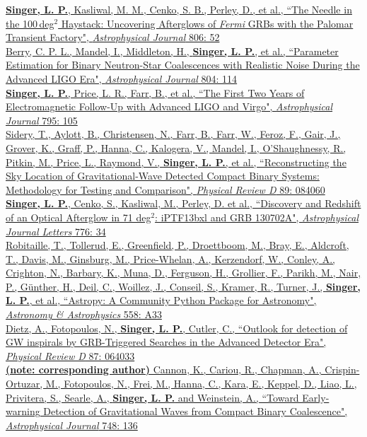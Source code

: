 \documentclass[10pt, letterpaper]{article} %
\newcommand{\years}[1]{\marginnote{\scriptsize #1}} %
\begin{document}
\years{2015}\href{http://dx.doi.org/10.1088/0004-637X/806/1/52}{\textbf{Singer, L. P.}, Kasliwal, M. M., Cenko, S. B., Perley, D., et al., “The Needle in the 100\,deg$^2$ Haystack: Uncovering Afterglows of \emph{Fermi} GRBs with the Palomar Transient Factory", \emph{Astrophysical Journal} 806: 52}\\[0.125cm]
%
\years{2015}\href{http://dx.doi.org/10.1088/0004-637X/804/2/114}{Berry, C. P. L., Mandel, I., Middleton, H., \textbf{Singer, L. P.}, et al., “Parameter Estimation for Binary Neutron-Star Coalescences with Realistic Noise During the Advanced LIGO Era", \emph{Astrophysical Journal} 804: 114}\\[0.125cm]
%
\years{2014}\href{http://dx.doi.org/10.1088/0004-637X/795/2/105}{\textbf{Singer, L. P.}, Price, L. R., Farr, B., et al., “The First Two Years of Electromagnetic Follow-Up with Advanced LIGO and Virgo", \emph{Astrophysical Journal} 795: 105}\\[0.125cm]
%
\years{2014}\href{http://dx.doi.org/10.1103/PhysRevD.89.084060}{Sidery, T., Aylott, B., Christensen, N., Farr, B., Farr, W., Feroz, F., Gair, J., Grover, K., Graff, P., Hanna, C., Kalogera, V., Mandel, I., O'Shaughnessy, R., Pitkin, M., Price, L., Raymond, V., \textbf{Singer, L. P.}, et al., “Reconstructing the Sky Location of Gravitational-Wave Detected Compact Binary Systems: Methodology for Testing and Comparison", \emph{Physical Review D} 89: 084060}\\[0.125cm]
%
\years{2013}\href{http://dx.doi.org/10.1088/2041-8205/776/2/L34}{\textbf{Singer, L. P.}, Cenko, S., Kasliwal, M., Perley, D. et al., “Discovery and Redshift of an Optical Afterglow in 71 deg$^2$: iPTF13bxl and GRB 130702A", \emph{Astrophysical Journal Letters} 776: 34}\\[0.125cm]
%
\years{2013}\href{http://dx.doi.org/10.1051/0004-6361/201322068}{Robitaille, T., Tollerud, E., Greenfield, P., Droettboom, M., Bray, E., Aldcroft, T., Davis, M., Ginsburg, M., Price-Whelan, A., Kerzendorf, W., Conley, A., Crighton, N., Barbary, K., Muna, D., Ferguson, H., Grollier, F., Parikh, M., Nair, P., Günther, H., Deil, C., Woillez, J., Conseil, S., Kramer, R., Turner, J., \textbf{Singer, L. P.}, et al., “Astropy: A Community Python Package for Astronomy", \emph{Astronomy \& Astrophysics} 558: A33}\\[0.125cm]
%
\years{2013}\href{http://dx.doi.org/10.1103/PhysRevD.87.064033}{Dietz, A., Fotopoulos, N., \textbf{Singer, L. P.}, Cutler, C., “Outlook for detection of GW inspirals by GRB-Triggered Searches in the Advanced Detector Era", \emph{Physical Review D} 87: 064033}\\[0.125cm]
%
\years{2012}\href{http://dx.doi.org/10.1088/0004-637X/748/2/136}{\textbf{(note: corresponding author)} Cannon, K., Cariou, R., Chapman, A., Crispin-Ortuzar, M., Fotopoulos, N., Frei, M., Hanna, C., Kara, E., Keppel, D., Liao, L., Privitera, S., Searle, A., \textbf{Singer, L. P.} and Weinstein, A., “Toward Early-warning Detection of Gravitational Waves from Compact Binary Coalescence", \emph{Astrophysical Journal} 748: 136}
\end{document}
